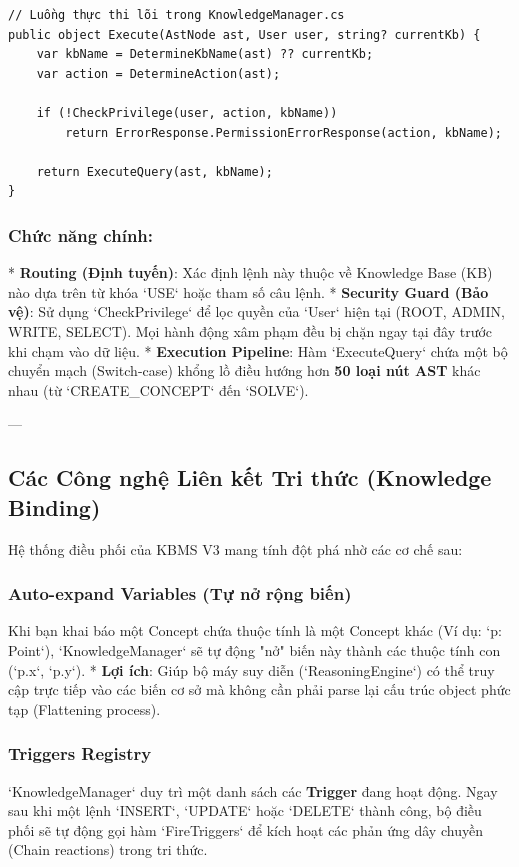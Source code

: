 \begin{verbatim}
// Luồng thực thi lõi trong KnowledgeManager.cs
public object Execute(AstNode ast, User user, string? currentKb) {
    var kbName = DetermineKbName(ast) ?? currentKb;
    var action = DetermineAction(ast);
    
    if (!CheckPrivilege(user, action, kbName)) 
        return ErrorResponse.PermissionErrorResponse(action, kbName);
        
    return ExecuteQuery(ast, kbName);
}
\end{verbatim}

\subsubsection{Chức năng chính:}
*   \textbf{Routing (Định tuyến)}: Xác định lệnh này thuộc về Knowledge Base (KB) nào dựa trên từ khóa `USE` hoặc tham số câu lệnh.
*   \textbf{Security Guard (Bảo vệ)}: Sử dụng `CheckPrivilege` để lọc quyền của `User` hiện tại (ROOT, ADMIN, WRITE, SELECT). Mọi hành động xâm phạm đều bị chặn ngay tại đây trước khi chạm vào dữ liệu.
*   \textbf{Execution Pipeline}: Hàm `ExecuteQuery` chứa một bộ chuyển mạch (Switch-case) khổng lồ điều hướng hơn \textbf{50 loại nút AST} khác nhau (từ `CREATE\_CONCEPT` đến `SOLVE`).

---

\subsection{Các Công nghệ Liên kết Tri thức (Knowledge Binding)}

Hệ thống điều phối của KBMS V3 mang tính đột phá nhờ các cơ chế sau:

\subsubsection{Auto-expand Variables (Tự nở rộng biến)}
Khi bạn khai báo một Concept chứa thuộc tính là một Concept khác (Ví dụ: `p: Point`), `KnowledgeManager` sẽ tự động "nở" biến này thành các thuộc tính con (`p.x`, `p.y`). 
*   \textbf{Lợi ích}: Giúp bộ máy suy diễn (`ReasoningEngine`) có thể truy cập trực tiếp vào các biến cơ sở mà không cần phải parse lại cấu trúc object phức tạp (Flattening process).

\subsubsection{Triggers Registry}
`KnowledgeManager` duy trì một danh sách các \textbf{Trigger} đang hoạt động. Ngay sau khi một lệnh `INSERT`, `UPDATE` hoặc `DELETE` thành công, bộ điều phối sẽ tự động gọi hàm `FireTriggers` để kích hoạt các phản ứng dây chuyền (Chain reactions) trong tri thức.

